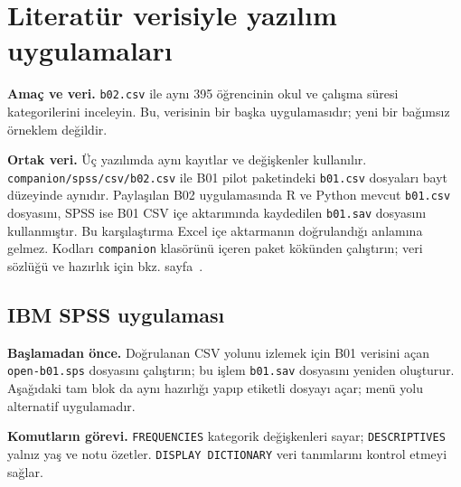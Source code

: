 \section{Literatür verisiyle yazılım uygulamaları}
\label{sec:spss-b02}

\textbf{Amaç ve veri.} \texttt{b02.csv} ile aynı 395 öğrencinin okul ve
çalışma süresi kategorilerini inceleyin. Bu, \citet{cortez2008data} verisinin
bir başka uygulamasıdır; yeni bir bağımsız örneklem değildir.


\textbf{Ortak veri.} Üç yazılımda aynı kayıtlar ve değişkenler kullanılır.
\nolinkurl{companion/spss/csv/b02.csv} ile B01 pilot paketindeki
\texttt{b01.csv} dosyaları bayt düzeyinde aynıdır. Paylaşılan B02
uygulamasında R ve Python mevcut \texttt{b01.csv} dosyasını, SPSS ise
B01 CSV içe aktarımında kaydedilen \texttt{b01.sav} dosyasını kullanmıştır.
Bu karşılaştırma Excel içe aktarmanın doğrulandığı anlamına gelmez.
Kodları \texttt{companion} klasörünü içeren paket kökünden çalıştırın;
veri sözlüğü ve hazırlık için bkz. sayfa~\pageref{sec:spss-guide}.

\subsection{IBM SPSS uygulaması}
\textbf{Başlamadan önce.} Doğrulanan CSV yolunu izlemek için B01
verisini açan \texttt{open-b01.sps} dosyasını çalıştırın; bu işlem
\texttt{b01.sav} dosyasını yeniden oluşturur. Aşağıdaki tam blok da
aynı hazırlığı yapıp etiketli dosyayı açar; menü yolu alternatif uygulamadır.

\begin{spssadimlar}
\end{spssadimlar}

{\raggedright
\noindent\textbf{Komutların görevi.} \texttt{FREQUENCIES} kategorik değişkenleri sayar; \texttt{DESCRIPTIVES} yalnız yaş ve notu özetler. \texttt{DISPLAY DICTIONARY} veri tanımlarını kontrol etmeyi sağlar.\par}

